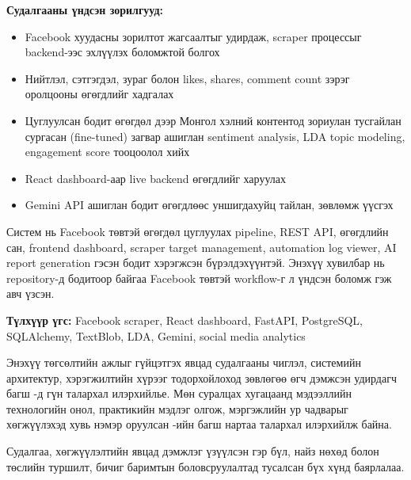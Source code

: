 \documentclass[
12pt,
oneside,
english,
onehalfspacing,
nolistspacing,
headsepline,
]{MUST-Thesis}
\newcommand{\acknowledgementname}{Талархал}
\begin{document}
\textbf{Судалгааны үндсэн зорилгууд:}
\begin{itemize}
    \item Facebook хуудасны зорилтот жагсаалтыг удирдаж, scraper процессыг backend-ээс эхлүүлэх боломжтой болгох
    \item Нийтлэл, сэтгэгдэл, зураг болон likes, shares, comment count зэрэг оролцооны өгөгдлийг хадгалах
    \item Цуглуулсан бодит өгөгдөл дээр Монгол хэлний контентод зориулан тусгайлан сургасан (fine-tuned) загвар ашиглан sentiment analysis, LDA topic modeling, engagement score тооцоолол хийх
    \item React dashboard-аар live backend өгөгдлийг харуулах
    \item Gemini API ашиглан бодит өгөгдлөөс уншигдахуйц тайлан, зөвлөмж үүсгэх
\end{itemize}

Систем нь Facebook төвтэй өгөгдөл цуглуулах pipeline, REST API, өгөгдлийн сан, frontend dashboard, scraper target management, automation log viewer, AI report generation гэсэн бодит хэрэгжсэн бүрэлдэхүүнтэй. Энэхүү хувилбар нь repository-д бодитоор байгаа Facebook төвтэй workflow-г л үндсэн боломж гэж авч үзсэн.

\textbf{Түлхүүр үгс:} Facebook scraper, React dashboard, FastAPI, PostgreSQL, SQLAlchemy, TextBlob, LDA, Gemini, social media analytics

\begin{acknowledgements}
\addchaptertocentry{\acknowledgementname}

Энэхүү төгсөлтийн ажлыг гүйцэтгэх явцад судалгааны чиглэл, системийн архитектур, хэрэгжилтийн хүрээг тодорхойлоход зөвлөгөө өгч дэмжсэн удирдагч багш \supname-д гүн талархал илэрхийлье. Мөн суралцах хугацаанд мэдээллийн технологийн онол, практикийн мэдлэг олгож, мэргэжлийн ур чадварыг хөгжүүлэхэд хувь нэмэр оруулсан \facname-ийн багш нартаа талархал илэрхийлж байна.

Судалгаа, хөгжүүлэлтийн явцад дэмжлэг үзүүлсэн гэр бүл, найз нөхөд болон төслийн туршилт, бичиг баримтын боловсруулалтад тусалсан бүх хүнд баярлалаа.

\end{acknowledgements}
\end{document}
